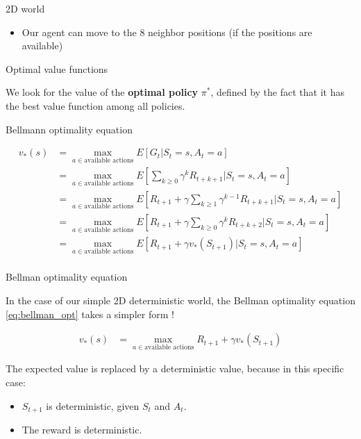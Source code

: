 \documentclass[usenames,dvipsnames,french]{beamer}
\begin{document}
\begin{frame}{2D world}
\begin{itemize}
    \item Our agent can move to the $8$ neighbor positions (if the positions are available)
\end{itemize}	
\end{frame}

\begin{frame}{Optimal value functions}

    We look for the value of the \textbf{optimal policy} $\pi^*$, defined by the fact that
    it has the best value function among all policies.

\end{frame}

\begin{frame}{Bellmann optimality equation}

           \begin{equation}
	       \begin{aligned}
	       	\label{eq:bellman_opt}
		   v_*(s) &= \max_{a\in\text{available actions}} E[G_t|S_t=s, A_t=a]\\
			    &= \max_{a\in\text{available actions}} E[\sum_{k\geq 0}\gamma^kR_{t+k+1}|S_t=s, A_t=a]\\
			    &= \max_{a\in\text{available actions}} E[R_{t+1}+\gamma\sum_{k\geq 1}\gamma^{k-1}R_{t+k+1}|S_t=s, A_t=a]\\
			    &= \max_{a\in\text{available actions}} E[R_{t+1}+\gamma\sum_{k\geq 0}\gamma^{k}R_{t+k+2}|S_t=s, A_t=a]\\
			    &= \max_{a\in\text{available actions}} E[R_{t+1}+\gamma v_{*}(S_{t+1})|S_t=s, A_t=a]\\
	       \end{aligned}
           \end{equation}

\end{frame}

\begin{frame}{Bellman optimality equation}

    In the case of our simple 2D deterministic world, the Bellman optimality equation \ref{eq:bellman_opt} takes a simpler form !

           \begin{equation}
	       \begin{aligned}
	       	\label{eq:bellman_opt_simple}
		   v_*(s) &= \max_{a\in\text{available actions}} R_{t+1}+\gamma v_{*}(S_{t+1})
	       \end{aligned}
           \end{equation}

	   The expected value is replaced by a deterministic value, because in this specific case:

	   \begin{itemize}
	       \item $S_{t+1}$ is deterministic, given $S_t$ and $A_t$.
		\item The reward is deterministic.
	   \end{itemize}

\end{frame}
\end{document}
